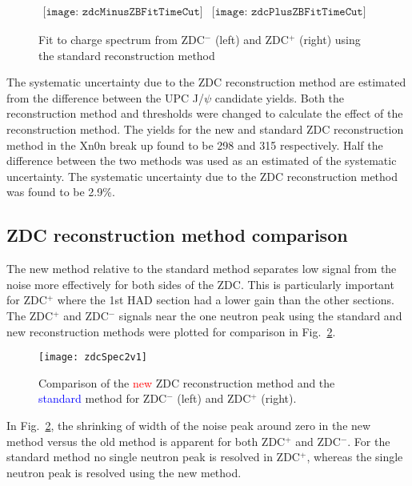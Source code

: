       \begin{figure}[!Hhtb]
        \centering
        $ \begin{array}{cc}
          \texttt{[image: zdcMinusZBFitTimeCut]} &
          \texttt{[image: zdcPlusZBFitTimeCut]}
        \end{array} $
        \caption{Fit to charge spectrum from ZDC$^{-}$ (left) and ZDC$^{+}$ 
          (right) using the standard reconstruction method}
        \label{fig:zdcM1Fit}
      \end{figure}

      The systematic uncertainty due to the ZDC reconstruction method are
        estimated from the difference between the UPC J/$\psi$ candidate yields.
      Both the reconstruction method and thresholds were changed to calculate 
        the effect of the reconstruction method.
      The yields for the new and standard ZDC reconstruction method in the Xn0n
        break up \DIFdelbegin {}\DIFdelend \DIFaddbegin {}\DIFaddend found to be 298 and 315 respectively. 
      Half the difference between the two methods was used as an estimated of 
        the systematic uncertainty.
      The systematic uncertainty due to the ZDC reconstruction method was 
        found to be 2.9\%.

    \subsection{ZDC reconstruction method comparison}
      The new method relative to the standard method separates low signal from 
        the noise more effectively for both sides of the ZDC.
      This is particularly important for ZDC$^{+}$ where the 1st HAD section
        had a lower gain than the other sections. 
      The ZDC$^{+}$ and ZDC$^{-}$ signals near the one neutron peak using the
        standard and new reconstruction methods were plotted for comparison in 
        Fig.~\ref{fig:zdcSpec2v1}.
      \begin{figure}[h]
        \centering
        \texttt{[image: zdcSpec2v1]}
        \caption{Comparison of the \textcolor{red}{new} ZDC reconstruction 
          method and the \textcolor{blue}{standard} method for ZDC$^{-}$ (left) and 
          ZDC$^{+}$ (right).}
        \label{fig:zdcSpec2v1}
      \end{figure}
      In Fig.~\ref{fig:zdcSpec2v1}, the shrinking of width of the noise peak 
        around zero in the new method versus the old method is apparent for
        both ZDC$^{+}$ and ZDC$^{-}$.
      For the standard method no single neutron peak is resolved in ZDC$^{+}$,
        whereas the single neutron peak is resolved using the new method. 

